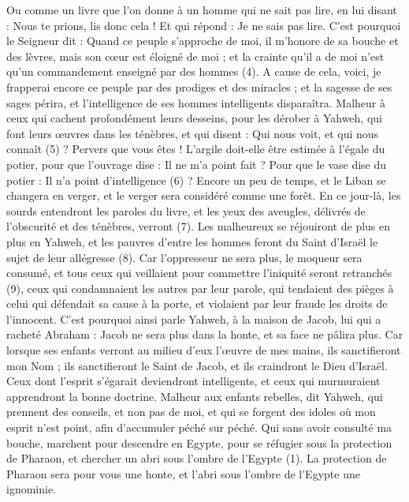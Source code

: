 \begin{multicols}{2}
Ou comme un livre que l’on donne à un homme qui ne sait pas lire, en lui disant : Nous te prions, lis donc cela ! Et qui répond : Je ne sais pas lire.
C'est pourquoi le Seigneur dit : Quand ce peuple s'approche de moi, il m’honore de sa bouche et des lèvres, mais son cœur est éloigné de moi ; et la crainte qu’il a de moi n’est qu’un commandement enseigné par des hommes (4).
A cause de cela, voici, je frapperai encore ce peuple par des prodiges et des miracles ; et la sagesse de ses sages périra, et l'intelligence de ses hommes intelligents disparaîtra.
Malheur à ceux qui cachent profondément leurs desseins, pour les dérober à Yahweh, qui font leurs œuvres dans les ténèbres, et qui disent : Qui nous voit, et qui nous connaît (5) ?
Pervers que vous êtes ! L’argile doit-elle être estimée à l’égale du potier, pour que l’ouvrage dise : Il ne m’a point fait ? Pour que le vase dise du potier : Il n’a point d’intelligence (6) ?
Encore un peu de temps, et le Liban se changera en verger, et le verger sera considéré comme une forêt.
En ce jour-là, les sourds entendront les paroles du livre, et les yeux des aveugles, délivrés de l'obscurité et des ténèbres, verront (7).
Les malheureux se réjouiront de plus en plus en Yahweh, et les pauvres d'entre les hommes feront du Saint d'Israël le sujet de leur allégresse (8).
Car l’oppresseur ne sera plus, le moqueur sera consumé, et tous ceux qui veillaient pour commettre l'iniquité seront retranchés (9),
ceux qui condamnaient les autres par leur parole, qui tendaient des pièges à celui qui défendait sa cause à la porte, et violaient par leur fraude les droits de l’innocent.
C'est pourquoi ainsi parle Yahweh, à la maison de Jacob, lui qui a racheté Abraham : Jacob ne sera plus dans la honte, et sa face ne pâlira plus.
Car lorsque ses enfants verront au milieu d’eux l’œuvre de mes mains, ils sanctifieront mon Nom ; ils sanctifieront le Saint de Jacob, et ils craindront le Dieu d'Israël.
Ceux dont l'esprit s’égarait deviendront intelligents, et ceux qui murmuraient apprendront la bonne doctrine.
\VerseOne{}Malheur aux enfants rebelles, dit Yahweh, qui prennent des conseils, et non pas de moi, et qui se forgent des idoles où mon esprit n'est point, afin d’accumuler péché sur péché.
Qui sans avoir consulté ma bouche, marchent pour descendre en Egypte, pour se réfugier sous la protection de Pharaon, et chercher un abri sous l'ombre de l'Egypte (1).
La protection de Pharaon sera pour vous une honte, et l’abri sous l'ombre de l'Egypte une ignominie.

\end{multicols}
